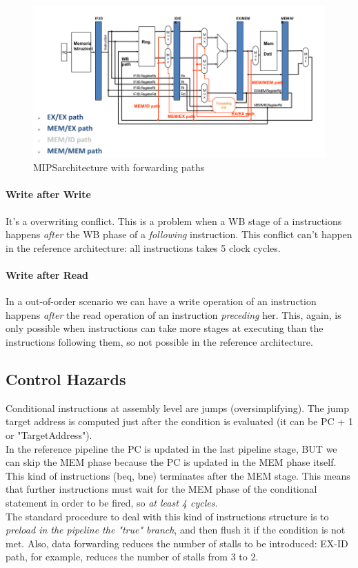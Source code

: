 \documentclass[10pt,a4paper]{article}
\begin{document}
					\begin{figure}[H]
						\centering
						\includegraphics[width = \textwidth]{./images/forwarding.png}
						\caption{MIPSarchitecture with forwarding paths}
					\end{figure}
				
				\paragraph{Write after Write}
					It's a overwriting conflict. This is a problem when a WB stage of a instructions happens \emph{after} the WB phase of a \emph{following} instruction. This conflict can't happen in the reference architecture: all instructions takes 5 clock cycles.
					
				\paragraph{Write after Read}
					In a out-of-order scenario we can have a write operation of an instruction happens \emph{after} the read operation of an instruction \emph{preceding} her. This, again, is only possible when instructions can take more stages at executing than the instructions following them, so not possible in the reference architecture.
			
			\subsection{Control Hazards}
				Conditional instructions at assembly level are jumps (oversimplifying). The jump target address is computed just after the condition is evaluated (it can be PC + 1 or "TargetAddress").\\
				In the reference pipeline the PC is updated in the last pipeline stage, BUT we can skip the MEM phase because the PC is updated in the MEM phase itself. This kind of instructions (beq, bne) terminates after the MEM stage. This means that further instructions must wait for the MEM phase of the conditional statement in order to be fired, so \emph{at least 4 cycles}.\\
				The standard procedure to deal with this kind of instructions structure is to \emph{preload in the pipeline the "true" branch}, and then flush it if the condition is not met. Also, data forwarding reduces the number of stalls to be introduced: EX-ID path, for example, reduces the number of stalls from 3 to 2.
				
\end{document}
